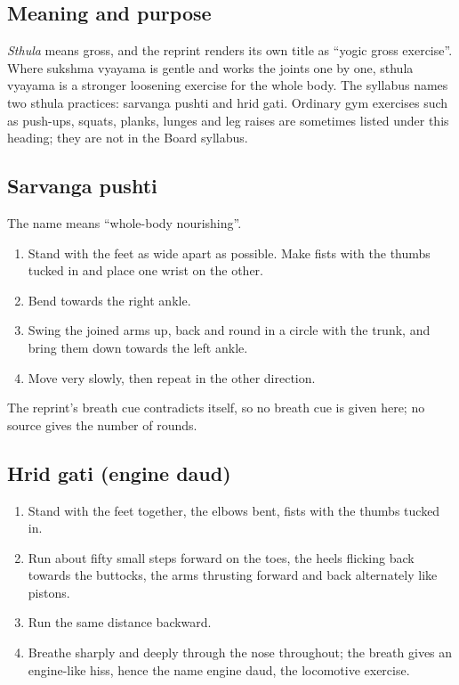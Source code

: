 \subsection*{Meaning and purpose}
\emph{Sthula} means gross, and the reprint renders its own title as ``yogic gross exercise''. Where sukshma vyayama is gentle and works the joints one by one, sthula vyayama is a stronger loosening exercise for the whole body. The syllabus names two sthula practices: sarvanga pushti and hrid gati. Ordinary gym exercises such as push-ups, squats, planks, lunges and leg raises are sometimes listed under this heading; they are not in the Board syllabus.

\subsection*{Sarvanga pushti}
The name means ``whole-body nourishing''.
\begin{enumerate}
\item Stand with the feet as wide apart as possible. Make fists with the thumbs tucked in and place one wrist on the other.
\item Bend towards the right ankle.
\item Swing the joined arms up, back and round in a circle with the trunk, and bring them down towards the left ankle.
\item Move very slowly, then repeat in the other direction.
\end{enumerate}
The reprint's breath cue contradicts itself, so no breath cue is given here; no source gives the number of rounds.


\subsection*{Hrid gati (engine daud)}
\begin{enumerate}
\item Stand with the feet together, the elbows bent, fists with the thumbs tucked in.
\item Run about fifty small steps forward on the toes, the heels flicking back towards the buttocks, the arms thrusting forward and back alternately like pistons.
\item Run the same distance backward.
\item Breathe sharply and deeply through the nose throughout; the breath gives an engine-like hiss, hence the name engine daud, the locomotive exercise.
\end{enumerate}

